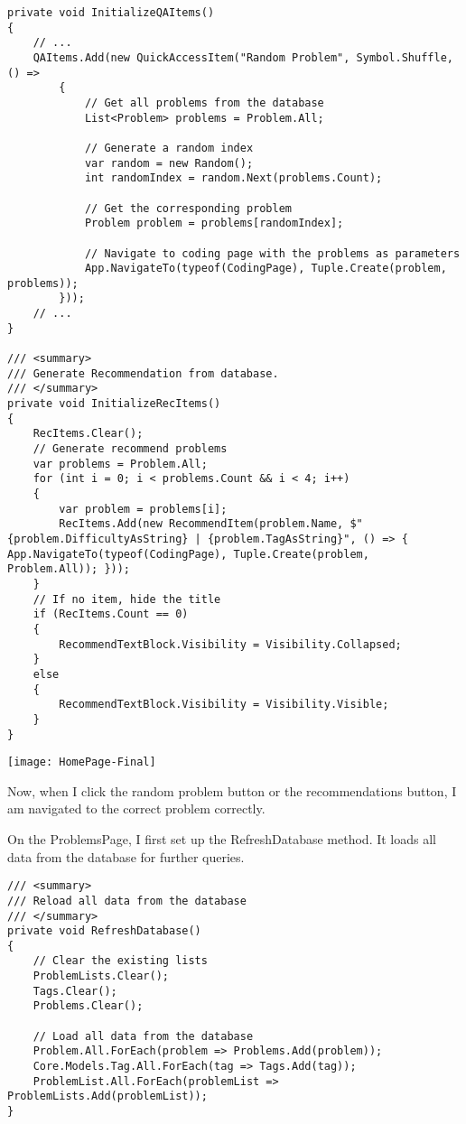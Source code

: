 \documentclass[report.tex]{subfiles}
\begin{document}
\begin{verbatim}
private void InitializeQAItems()
{
    // ...    
    QAItems.Add(new QuickAccessItem("Random Problem", Symbol.Shuffle, () =>
        {
            // Get all problems from the database
            List<Problem> problems = Problem.All;

            // Generate a random index
            var random = new Random();
            int randomIndex = random.Next(problems.Count);

            // Get the corresponding problem
            Problem problem = problems[randomIndex];

            // Navigate to coding page with the problems as parameters
            App.NavigateTo(typeof(CodingPage), Tuple.Create(problem, problems));
        }));
    // ...
}

/// <summary>
/// Generate Recommendation from database.
/// </summary>
private void InitializeRecItems()
{
    RecItems.Clear();
    // Generate recommend problems
    var problems = Problem.All;
    for (int i = 0; i < problems.Count && i < 4; i++)
    {
        var problem = problems[i];
        RecItems.Add(new RecommendItem(problem.Name, $"{problem.DifficultyAsString} | {problem.TagAsString}", () => { App.NavigateTo(typeof(CodingPage), Tuple.Create(problem, Problem.All)); }));
    }
    // If no item, hide the title
    if (RecItems.Count == 0)
    {
        RecommendTextBlock.Visibility = Visibility.Collapsed;
    }
    else
    {
        RecommendTextBlock.Visibility = Visibility.Visible;
    }
}
\end{verbatim}

\texttt{[image: HomePage-Final]}

Now, when I click the random problem button or the recommendations button, I am navigated to the correct problem correctly.

On the ProblemsPage, I first set up the RefreshDatabase method. It loads all data from the database for further queries.

\begin{verbatim}
/// <summary>
/// Reload all data from the database
/// </summary>
private void RefreshDatabase()
{
    // Clear the existing lists
    ProblemLists.Clear();
    Tags.Clear();
    Problems.Clear();

    // Load all data from the database
    Problem.All.ForEach(problem => Problems.Add(problem));
    Core.Models.Tag.All.ForEach(tag => Tags.Add(tag));
    ProblemList.All.ForEach(problemList => ProblemLists.Add(problemList));
}
\end{verbatim}
\end{document}
